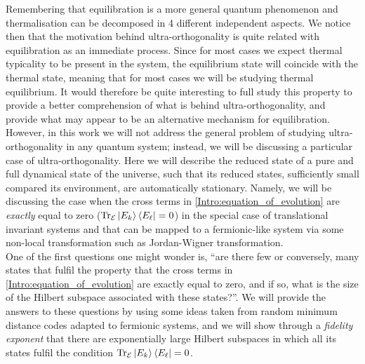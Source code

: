 \indent Remembering that equilibration is a more general quantum phenomenon and thermalisation can be  decomposed in 4 different independent aspects. We notice then that the motivation behind ultra-orthogonality is quite related with equilibration as an immediate process. Since for most cases we expect thermal typicality to be present in the system, the equilibrium state will coincide with the thermal state, meaning that for most cases we will be studying thermal equilibrium.
It would therefore be quite interesting to full study this property to provide a better comprehension of what is behind ultra-orthogonality, and provide what may appear to be an alternative mechanism for equilibration. However, in this work we will not address the general problem of studying ultra-orthogonality in any quantum system; instead, we will be discussing a particular case of ultra-orthogonality. Here we will describe the reduced state of a pure and full dynamical state of the universe, such that its reduced states, sufficiently small compared its environment, are automatically stationary. Namely, we will be discussing the case when the cross terms in \eqref{Intro:equation_of_evolution} are \textit{exactly} equal to zero ($\operatorname{Tr}_{\mathcal{E}}\mathinner{|{E_k}\rangle}\mathinner{\langle{E_\ell}|} = 0$) in the special case of translational invariant systems and that can be mapped to a fermionic-like system via some non-local transformation such as Jordan-Wigner transformation\cite{reyes-lega_aspects_2016}.\\


\indent One of the first questions one might wonder is, ``are there few or conversely, many states that fulfil the property that the cross terms in \eqref{Intro:equation_of_evolution} are exactly equal to zero, and if so, what is the size of the Hilbert subspace associated with these states?''. We will provide the answers to these questions by using some ideas taken from random minimum distance codes adapted to fermionic systems, and we will show through a \textit{fidelity exponent} that there are exponentially large Hilbert subspaces in which all its states fulfil the condition $\operatorname{Tr}_{\mathcal{E}}\mathinner{|{E_k}\rangle}\mathinner{\langle{E_\ell}|} = 0$.\\

